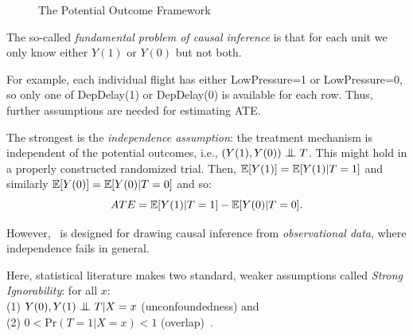 \begin{figure}
  \centering
{\scriptsize
}
\caption{The Potential Outcome Framework}
  \label{fig:causal:inference}
  \vspace{-3mm}
\end{figure}
\noindent
The so-called {\em fundamental problem of causal inference} %
is that
for each unit we only know either $Y(1)$ or $Y(0)$ but not both.
 For example, each individual
flight has either LowPressure=1 or LowPressure=0, so only one of DepDelay(1)
or DepDelay(0) is available for each row.
Thus, further assumptions are needed for estimating ATE. 


The strongest is the {\em independence assumption}:
the treatment mechanism is independent of the potential outcomes,
i.e., $(Y(1), Y(0)) \bigCI T$. This might hold in a properly constructed randomized trial. Then,
$\mathbb{E}[Y(1)]=\mathbb{E}[Y(1)|T=1]$ and similarly $\mathbb{E}[Y(0)]=\mathbb{E}[Y(0)|T=0]$ and so:  $$ATE = \mathbb{E}[Y(1)|T=1]-\mathbb{E}[Y(0)|T=0].$$

However, \GSQL\  is designed for drawing causal inference from {\em
  observational data}, where independence fails in general.   Here, statistical literature makes two standard, weaker
assumptions called {\em Strong
  Ignorability}: for all $x$: \\%
  (1)  ${Y(0), Y(1) \bigCI T} | X=x$ (unconfoundedness) and \\
  (2) $0 < \textrm{Pr}(T = 1 | X=x) < 1$ (overlap)~\cite{Rubin1983b}.


